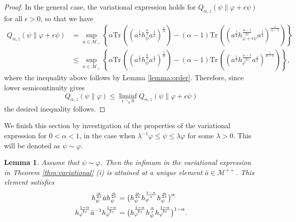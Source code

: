 \documentclass[12pt]{article}
\newtheorem{lemma}[theorem]{Lemma}
\theoremstyle{definition}
\theoremstyle{remark}
\numberwithin{equation}{section}
\def\Me{\mathcal M}
\def \Tr{\mathrm{Tr}\,}
\def\ffi{\varphi}
\begin{document}
\begin{proof}
In the general case,  the variational expression holds for
$Q_{\alpha,z}(\psi\|\varphi+\epsilon\psi)$  for all $\epsilon>0$, so that we have
\begin{align*}
Q_{\alpha,z}(\psi\|\varphi+\epsilon\psi)&=\sup_{a\in \Me_+} \left\{\alpha
\Tr\left((a^{\frac12}h_\psi^{\frac{\alpha}{z}}a^{\frac12})^{\frac{z}{\alpha}}\right)-(\alpha-1)
\Tr\left((a^{\frac12}h_{\varphi+\epsilon \psi}^{\frac{\alpha-1}{2z}}a^{\frac12})^{\frac{z}{\alpha-1}}\right) \right\}\\
&\le\sup_{a\in \Me_+} \left\{\alpha
\Tr\left((a^{\frac12}h_\psi^{\frac{\alpha}{z}}a^{\frac12})^{\frac{z}{\alpha}}\right)-(\alpha-1)
\Tr\left((a^{\frac12}h_\varphi^{\frac{\alpha-1}{2z}}a^{\frac12})^{\frac{z}{\alpha-1}}\right)
\right\},
\end{align*}
where the inequality above follows by Lemma \ref{lemma:order}. Therefore, since lower
semicontinuity  \cite[Theorem 2 (iv)]{kato2023onrenyi} gives
\[
Q_{\alpha,z}(\psi\|\varphi)\le \liminf_{\epsilon\searrow 0}
Q_{\alpha,z}(\psi\|\varphi+\epsilon \psi) 
\]
the desired inequality follows.

 
\end{proof}

We finish this section by investigation of the properties of the variational expression for
$0<\alpha<1$, in the case when $\lambda^{-1}\ffi\le \psi\le \lambda \ffi$ for some
$\lambda>0$. This will be denoted as $\psi\sim \ffi$. 


\begin{lemma}\label{lemma:variational_majorized}  Assume that $\psi\sim\ffi$. Then
the infimum in the variational expression in Theorem \ref{thm:variational} (i) is attained at a unique element  $\bar a\in \Me^{++}$. This element  satisfies
\begin{align}
h_\psi^{\alpha\over2z}\bar ah_\psi^{\alpha\over2z}
&=\bigl(h_\psi^{\alpha\over2z}h_\ffi^{1-\alpha\over z}h_\psi^{\alpha\over2z}\bigr)^\alpha
\label{eq:minimizer1}\\
h_\ffi^{1-\alpha\over2z}\bar a^{-1}h_\ffi^{1-\alpha\over2z}
&=\bigl(h_\ffi^{1-\alpha\over2z}h_\psi^{\alpha\over
z}h_\ffi^{1-\alpha\over2z}\bigr)^{1-\alpha}.
\label{eq:minimizer2}
\end{align}
\end{lemma}
\end{document}
